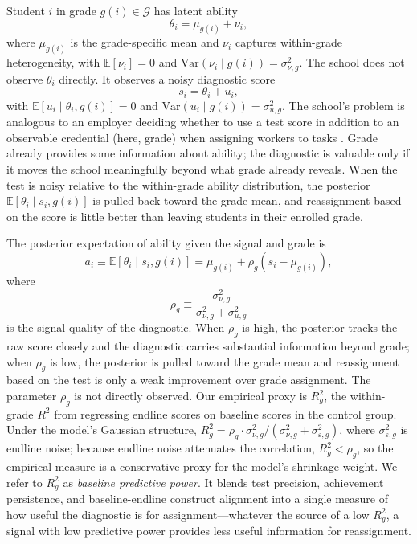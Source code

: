 \documentclass[11pt]{article}
\newcommand{\E}{\mathbb{E}}
\begin{document}
Student $i$ in grade $g(i) \in \mathcal{G}$ has latent ability
\begin{equation}
\label{eq:ability}
\theta_i = \mu_{g(i)} + \nu_i,
\end{equation}
where $\mu_{g(i)}$ is the grade-specific mean and $\nu_i$ captures within-grade heterogeneity, with $\E[\nu_i] = 0$ and $\text{Var}(\nu_i \mid g(i)) = \sigma^2_{\nu,g}$. The school does not observe $\theta_i$ directly. It observes a noisy diagnostic score
\begin{equation}
\label{eq:score}
s_i = \theta_i + u_i,
\end{equation}
with $\E[u_i \mid \theta_i, g(i)] = 0$ and $\text{Var}(u_i \mid g(i)) = \sigma^2_{u,g}$. The school's problem is analogous to an employer deciding whether to use a test score in addition to an observable credential (here, grade) when assigning workers to tasks \citep{AutorScarborough2008}. Grade already provides some information about ability; the diagnostic is valuable only if it moves the school meaningfully beyond what grade already reveals. When the test is noisy relative to the within-grade ability distribution, the posterior $\E[\theta_i \mid s_i, g(i)]$ is pulled back toward the grade mean, and reassignment based on the score is little better than leaving students in their enrolled grade.

The posterior expectation of ability given the signal and grade is
\begin{equation}
\label{eq:posterior}
a_i \equiv \E[\theta_i \mid s_i, g(i)] = \mu_{g(i)} + \rho_g(s_i - \mu_{g(i)}),
\end{equation}
where
\begin{equation}
\label{eq:signal_quality}
\rho_g \equiv \frac{\sigma^2_{\nu,g}}{\sigma^2_{\nu,g} + \sigma^2_{u,g}}
\end{equation}
is the signal quality of the diagnostic. When $\rho_g$ is high, the posterior tracks the raw score closely and the diagnostic carries substantial information beyond grade; when $\rho_g$ is low, the posterior is pulled toward the grade mean and reassignment based on the test is only a weak improvement over grade assignment. The parameter $\rho_g$ is not directly observed. Our empirical proxy is $R^2_g$, the within-grade $R^2$ from regressing endline scores on baseline scores in the control group. Under the model's Gaussian structure, $R^2_g = \rho_g \cdot \sigma^2_{\nu,g}/(\sigma^2_{\nu,g} + \sigma^2_{\varepsilon,g})$, where $\sigma^2_{\varepsilon,g}$ is endline noise; because endline noise attenuates the correlation, $R^2_g < \rho_g$, so the empirical measure is a conservative proxy for the model's shrinkage weight. We refer to $R^2_g$ as \emph{baseline predictive power}. It blends test precision, achievement persistence, and baseline-endline construct alignment into a single measure of how useful the diagnostic is for assignment---whatever the source of a low $R^2_g$, a signal with low predictive power provides less useful information for reassignment.
\end{document}
